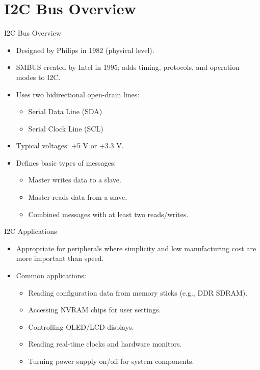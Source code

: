 
\section{I2C Bus Overview}
\begin{frame}{I2C Bus Overview}
    \begin{itemize}
        \item Designed by Philips in 1982 (physical level).
        \item SMBUS created by Intel in 1995; adds timing, protocols, and operation modes to I2C.
        \item Uses two bidirectional open-drain lines:
        \begin{itemize}
            \item Serial Data Line (SDA)
            \item Serial Clock Line (SCL)
        \end{itemize}
        \item Typical voltages: +5 V or +3.3 V.
        \item Defines basic types of messages:
        \begin{itemize}
            \item Master writes data to a slave.
            \item Master reads data from a slave.
            \item Combined messages with at least two reads/writes.
        \end{itemize}
    \end{itemize}
\end{frame}

\begin{frame}{I2C Applications}
    \begin{itemize}
        \item Appropriate for peripherals where simplicity and low manufacturing cost are more important than speed.
        \item Common applications:
        \begin{itemize}
            \item Reading configuration data from memory sticks (e.g., DDR SDRAM).
            \item Accessing NVRAM chips for user settings.
            \item Controlling OLED/LCD displays.
            \item Reading real-time clocks and hardware monitors.
            \item Turning power supply on/off for system components.
        \end{itemize}
    \end{itemize}
\end{frame}

